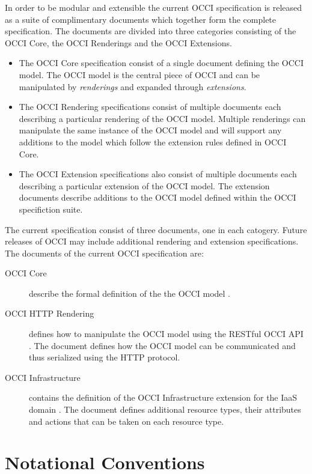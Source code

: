 \documentclass[10pt,a4paper,british]{article}
\begin{document}
In order to be modular and extensible the current OCCI specification is
released as a suite of complimentary documents which together form the complete
specification.
%
The documents are divided into three categories consisting of the OCCI Core,
the OCCI Renderings and the OCCI Extensions.
%
\begin{itemize}
\item The OCCI Core specification consist of a single document defining the
OCCI model. The OCCI model is the central piece of OCCI and can be manipulated
by {\em renderings} and expanded through {\em extensions}.
\item The OCCI Rendering specifications consist of multiple documents each
describing a particular rendering of the OCCI model. Multiple renderings can
manipulate the same instance of the OCCI model and will support any additions
to the model which follow the extension rules defined in OCCI Core.
\item The OCCI Extension specifications also consist of multiple documents each
describing a particular extension of the OCCI model. The extension documents
describe additions to the OCCI model defined within the OCCI specifiction
suite.
\end{itemize}
%
The current specification consist of three documents, one in each catogery.
Future releases of OCCI may include additional rendering and extension
specifications. The documents of the current OCCI specification are:

\begin{description}
\item[OCCI Core] describe the formal definition of the the OCCI model
\cite{occi:core}.
\item[OCCI HTTP Rendering] defines how to manipulate the OCCI model using the
RESTful OCCI API \cite{occi:http}. The document defines how the OCCI model can
be communicated and thus serialized using the HTTP protocol.
\item[OCCI Infrastructure] contains the definition of the OCCI Infrastructure
extension for the IaaS domain \cite{occi:infrastructure}. The document defines
additional resource types, their attributes and actions that can be taken on
each resource type.
\end{description}


\section{Notational Conventions}

\end{document}
